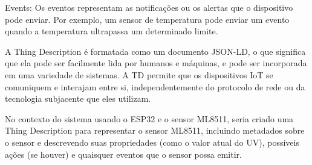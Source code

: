 Events: Os eventos representam as notificações ou os alertas que o dispositivo pode enviar. Por exemplo, um sensor de temperatura pode enviar um evento quando a temperatura ultrapassa um determinado limite.

A Thing Description é formatada como um documento JSON-LD, o que significa que ela pode ser facilmente lida por humanos e máquinas, e pode ser incorporada em uma variedade de sistemas. A TD permite que os dispositivos IoT se comuniquem e interajam entre si, independentemente do protocolo de rede ou da tecnologia subjacente que eles utilizam.

No contexto do sistema usando o ESP32 e o sensor ML8511, seria criado uma Thing Description para representar o sensor ML8511, incluindo metadados sobre o sensor e descrevendo suas propriedades (como o valor atual do UV), possíveis ações (se houver) e quaisquer eventos que o sensor possa emitir.

